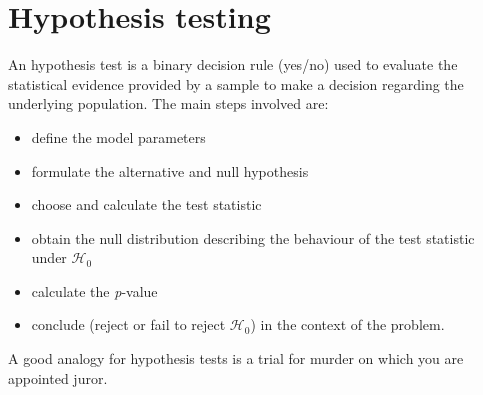 \documentclass[
  11pt,
  letterpaper,
]{scrbook}
\providecommand{\tightlist}{%
  \setlength{\itemsep}{0pt}\setlength{\parskip}{0pt}}\usepackage{longtable,booktabs,array}
\theoremstyle{definition}
\theoremstyle{definition}
\theoremstyle{remark}
\begin{document}
\section{Hypothesis testing}\label{tests}

An hypothesis test is a binary decision rule (yes/no) used to evaluate
the statistical evidence provided by a sample to make a decision
regarding the underlying population. The main steps involved are:

\begin{itemize}
\tightlist
\item
  define the model parameters
\item
  formulate the alternative and null hypothesis
\item
  choose and calculate the test statistic
\item
  obtain the null distribution describing the behaviour of the test
  statistic under \(\mathscr{H}_0\)
\item
  calculate the \emph{p}-value
\item
  conclude (reject or fail to reject \(\mathscr{H}_0\)) in the context
  of the problem.
\end{itemize}

A good analogy for hypothesis tests is a trial for murder on which you
are appointed juror.
\end{document}
